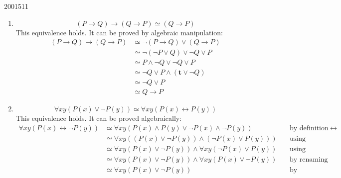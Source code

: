 \documentclass[10pt,\jkfside,a4paper]{article}
\begin{document}
\begin{examquestion}{2001}{5}{11}
\begin{enumerate}
\begin{enumerate}
\iffalse
\[
\begin{split}
& (P \wedge (Q \to R)) \to S \\
\simeq & \neg(P \wedge (Q \to R)) \vee S \\
\simeq & \neg (Q \to R) \vee \neg P \vee S\\
\simeq & \neg P \vee \neg (\neg Q \vee R) \vee S \\
\simeq & \neg P \vee Q \wedge \neg R \vee S \\
\simeq & (\neg P \vee Q \vee S) \wedge (\neg P \vee \neg R \vee S) \\
\not\simeq & (\neg P \vee \neg Q \vee S) \wedge (\neg P \vee \neg R \vee S) \\
\end{split}
\]
\fi

\item \[
\left( P \to Q \right) \to \left( Q \to P \right)
\simeq
\left( Q \to P \right)
\]
This equivalence holds. It can be proved by algebraic manipulation:
\begin{align*}
(P \to Q) \to (Q \to P)
&\simeq \neg(P \to Q) \vee (Q \to P) \\
&\simeq \neg(\neg P \vee Q) \vee \neg Q \vee P \\
&\simeq P \wedge \neg Q \vee \neg Q \vee P \\
&\simeq \neg Q \vee P \wedge (\mathbf{t} \vee \neg Q) \\
&\simeq \neg Q \vee P \\
&\simeq Q \to P
\end{align*}

\item \[
\forall xy \left( P(x) \vee \neg P(y) \right)
\simeq
\forall xy \left( P(x) \leftrightarrow P(y) \right)
\]
This equivalence holds. It can be proved algebraically:
\begin{align*}
\forall x y (P(x) \leftrightarrow \neg P(y))
&\simeq \forall x y (P(x) \wedge P(y) \vee \neg P(x) \wedge
\neg P(y)) \ &&\text{by definition of $\leftrightarrow$} \\
&\simeq \forall x y ((P(x) \vee \neg P(y)) \wedge (\neg P(x)
\vee P(y))) \ &&\text{using distributivity} \\
&\simeq \forall x y (P(x) \vee \neg P(y)) \wedge \forall x y
(\neg P(x) \vee P(y)) \ &&\text{using distributivity} \\
&\simeq \forall x y (P(x) \vee \neg P(y)) \wedge \forall x y
(P(x) \vee \neg P(y)) \ &&\text{by renaming variables} \\
&\simeq \forall x y (P(x) \vee \neg P(y)) \ &&\text{by idempotence}
\end{align*}

\end{enumerate}

\end{enumerate}

\end{examquestion}
\end{document}
